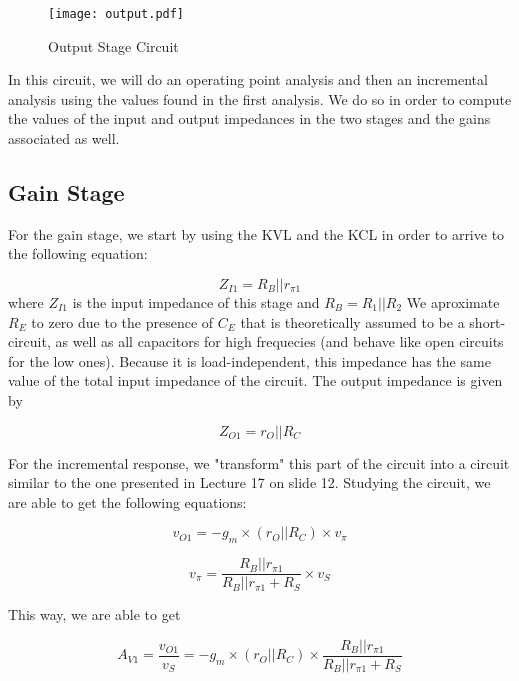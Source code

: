 \begin{figure}[H] \centering
\texttt{[image: output.pdf]}
\caption{Output Stage Circuit}
\label{fig:output}
\end{figure}


\par In this circuit, we will do an operating point analysis and then an incremental analysis using the values found in the first analysis. We do so in order to compute the values of the input and output impedances in the two stages and the gains associated as well.

\subsection{Gain Stage}

For the gain stage, we start by using the KVL and the KCL in order to arrive to the following equation:

\begin{equation}
Z_{I1} = R_B||r_{\pi1}
\label{eq:1.1}
\end{equation}
where $Z_{I1}$ is the input impedance of this stage and $R_B = R_1 || R_2$
We aproximate $R_E$ to zero due to the presence of $C_E$ that is theoretically assumed to be a short-circuit, as well as all capacitors for high frequecies (and behave like open circuits for the low ones). Because it is load-independent, this impedance has the same value of the total input impedance of the circuit.
The output impedance is given by 

\begin{equation}
Z_{O1} = r_O||R_C
\label{eq:1.2}
\end{equation}

For the incremental response, we "transform" this part of the circuit into a circuit similar to the one presented in Lecture 17 on slide 12. Studying the circuit, we are able to get the following equations:

\begin{equation}
v_{O1} = -g_m \times (r_O||R_C) \times v_\pi
\label{eq:1.3}
\end{equation}

\begin{equation}
v_\pi = \frac{R_B||r_{\pi 1}}{R_B||r_{\pi 1}+R_S} \times v_S
\label{eq:1.4}
\end{equation}

This way, we are able to get

\begin{equation}
A_{V1} = \frac{v_{O1}}{v_S} = -g_m \times (r_O||R_C) \times \frac{R_B||r_{\pi 1}}{R_B||r_{\pi 1}+R_S}
\label{eq:1.5}
\end{equation}

